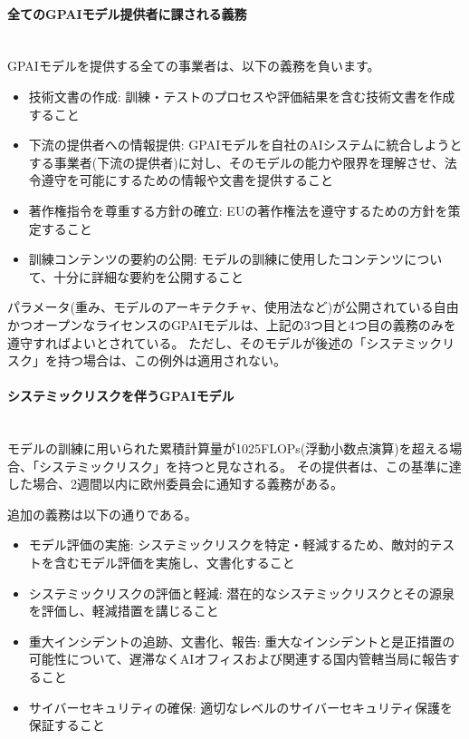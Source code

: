\paragraph{全てのGPAIモデル提供者に課される義務} \\
GPAIモデルを提供する全ての事業者は、以下の義務を負います。

\begin{itemize}
    \item 技術文書の作成: 訓練・テストのプロセスや評価結果を含む技術文書を作成すること
    \item 下流の提供者への情報提供: GPAIモデルを自社のAIシステムに統合しようとする事業者(下流の提供者)に対し、そのモデルの能力や限界を理解させ、法令遵守を可能にするための情報や文書を提供すること
    \item 著作権指令を尊重する方針の確立: EUの著作権法を遵守するための方針を策定すること
    \item 訓練コンテンツの要約の公開: モデルの訓練に使用したコンテンツについて、十分に詳細な要約を公開すること
\end{itemize}

パラメータ(重み、モデルのアーキテクチャ、使用法など)が公開されている自由かつオープンなライセンスのGPAIモデルは、上記の3つ目と4つ目の義務のみを遵守すればよいとされている。
ただし、そのモデルが後述の「システミックリスク」を持つ場合は、この例外は適用されない。

\paragraph{システミックリスクを伴うGPAIモデル} \\
モデルの訓練に用いられた累積計算量が1025FLOPs(浮動小数点演算)を超える場合、「システミックリスク」を持つと見なされる。
その提供者は、この基準に達した場合、2週間以内に欧州委員会に通知する義務がある。

追加の義務は以下の通りである。

\begin{itemize}
    \item モデル評価の実施: システミックリスクを特定・軽減するため、敵対的テストを含むモデル評価を実施し、文書化すること
    \item システミックリスクの評価と軽減: 潜在的なシステミックリスクとその源泉を評価し、軽減措置を講じること
    \item 重大インシデントの追跡、文書化、報告: 重大なインシデントと是正措置の可能性について、遅滞なくAIオフィスおよび関連する国内管轄当局に報告すること
    \item サイバーセキュリティの確保: 適切なレベルのサイバーセキュリティ保護を保証すること
\end{itemize}


